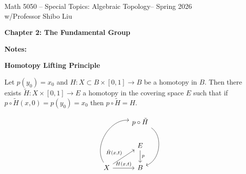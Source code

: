 \documentclass[12pt,a4paper]{report}
\newcommand{\CLASSNAME}{Math 5050 -- Special Topics: Algebraic Topology}
\newcommand{\PROFESSOR}{Professor Shibo Liu}
\newcommand{\SEMESTER}{Spring 2026}
\begin{document}
\begin{center}
	\Large{\CLASSNAME -- \SEMESTER} \\
	\large{ w/\PROFESSOR}
\end{center}

\begin{center}
\textbf{\Large{Chapter 2: The Fundamental Group}}
\end{center}

\HLINE 
\noindent\textbf{Notes:}

\begin{description}
	\item \textbf{Homotopy Lifting Principle}
	
	Let $p(y_0) = x_0$ and $H:X \subset B \times [0,1] \to B$ be a homotopy in $B$.  Then there exists $\tilde{H}: X \times [0,1] \to E$ a homotopy in the covering space $E$ such that if $p\circ \tilde{H}(x,0) = p(y_0)=x_0$ then $p\circ \tilde{H} = H$.
	
\[\begin{tikzcd}
	& p \circ \tilde{H} 
		\arrow[dd, bend left=65] \\
	& E \arrow[d, "p",]\\
	X 	\arrow[uur, bend left=65, {name=compose}] 
		\arrow[ru] {} {\tilde{H}(x,t)} \arrow[r] {} {H(x,t)} & 
	B
\end{tikzcd}\]
\end{description}

\HLINE
\end{document}
